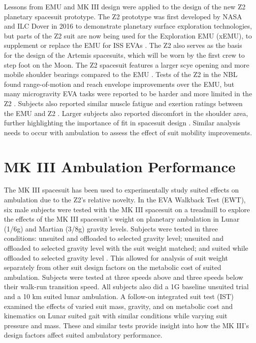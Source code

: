 \documentclass[defaultstyle,11pt]{thesis}
\begin{document}
Lessons from EMU and MK III design were applied to the design of the new Z2 planetary spacesuit prototype.
The Z2 prototype was first developed by NASA and ILC Dover in 2016 to demonstrate planetary surface exploration technologies, but parts of the Z2 suit are now being used for the Exploration EMU (xEMU), to supplement or replace the EMU for ISS EVAs \citep{Graziosi2016, Meginnis2018}.
The Z2 also serves as the basis for the design of the Artemis spacesuits, which will be worn by the first crew to step foot on the Moon.
The Z2 spacesuit features a larger scye opening and more mobile shoulder bearings compared to the EMU \citep{Graziosi2016}.
Tests of the Z2 in the NBL found range-of-motion and reach envelope improvements over the EMU, but many microgravity EVA tasks were reported to be harder and more limited in the Z2 \citep{Meginnis2018}.
Subjects also reported similar muscle fatigue and exertion ratings between the EMU and Z2 \citep{Meginnis2018}.
Larger subjects also reported discomfort in the shoulder area, further highlighting the importance of fit in spacesuit design \citep{Meginnis2018}.
Similar analysis needs to occur with ambulation to assess the effect of suit mobility improvements.

\hypertarget{mk-iii-ambulation-performance}{%
\section{MK III Ambulation Performance}\label{mk-iii-ambulation-performance}}

The MK III spacesuit has been used to experimentally study suited effects on ambulation due to the Z2's relative novelty.
In the EVA Walkback Test (EWT), six male subjects were tested with the MK III spacesuit on a treadmill to explore the effects of the MK III spacesuit's weight on planetary ambulation in Lunar (1/6g) and Martian (3/8g) gravity levels.
Subjects were tested in three conditions: unsuited and offloaded to selected gravity level; unsuited and offloaded to selected gravity level with the suit weight matched; and suited while offloaded to selected gravity level \citep{Norcross2009}.
This allowed for analysis of suit weight separately from other suit design factors on the metabolic cost of suited ambulation.
Subjects were tested at three speeds above and three speeds below their walk-run transition speed.
All subjects also did a 1G baseline unsuited trial and a 10 km suited lunar ambulation.
A follow-on integrated suit test (IST) examined the effects of varied suit mass, gravity, and on metabolic cost and kinematics on Lunar suited gait \citep{Norcross2010} with similar conditions while varying suit pressure and mass.
These and similar tests provide insight into how the MK III's design factors affect suited ambulatory performance.
\end{document}
